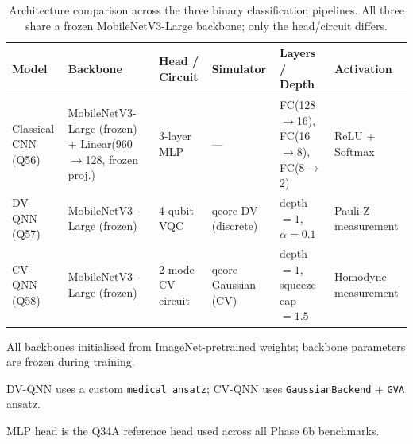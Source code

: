 
\begin{table}[htbp]
\centering
\caption{Architecture comparison across the three binary classification pipelines.
  All three share a frozen MobileNetV3-Large backbone; only the head/circuit differs.}
\label{tab:architecture}
\begin{tabular}{llllll}
\toprule
\textbf{Model} & \textbf{Backbone} & \textbf{Head / Circuit} & \textbf{Simulator} & \textbf{Layers / Depth} & \textbf{Activation} \\
\midrule
Classical CNN (Q56)
  & MobileNetV3-Large (frozen) + Linear(960$\to$128, frozen proj.)
  & 3-layer MLP
  & ---
  & FC(128$\to$16), FC(16$\to$8), FC(8$\to$2)
  & ReLU + Softmax \\
DV-QNN (Q57)
  & MobileNetV3-Large (frozen)
  & 4-qubit VQC
  & qcore DV (discrete)
  & depth$=1$, $\alpha{=}0.1$
  & Pauli-Z measurement \\
CV-QNN (Q58)
  & MobileNetV3-Large (frozen)
  & 2-mode CV circuit
  & qcore Gaussian (CV)
  & depth$=1$, squeeze cap$=1.5$
  & Homodyne measurement \\
\bottomrule
\end{tabular}
\begin{tablenotes}
\small
\item All backbones initialised from ImageNet-pretrained weights; backbone parameters are frozen during training.
\item DV-QNN uses a custom \texttt{medical\_ansatz}; CV-QNN uses \texttt{GaussianBackend} + \texttt{GVA} ansatz.
\item MLP head is the Q34A reference head used across all Phase 6b benchmarks.
\end{tablenotes}
\end{table}
